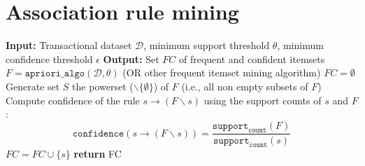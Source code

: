 \documentclass[12pt, openany]{report}
\theoremstyle{definition}
\begin{document}
\section{Association rule mining}
\begin{algorithm}[H]
    \caption{\texttt{Association\_rule\_mining\_algo}($\mathcal{D}$, $\theta$, $\epsilon$)}
    \begin{algorithmic}[1]
        \State \textbf{Input:} Transactional dataset $\mathcal{D}$, minimum support threshold $\theta$, minimum confidence threshold $\epsilon$
        \State \textbf{Output:} Set $FC$ of frequent and confident itemsets
        \State $F = \texttt{apriori\_algo}(\mathcal{D}, \theta)$ (OR other frequent itemset mining algorithm)
        \State $FC = \emptyset$
        \State Generate set $S$ the powerset ($\backslash \{\emptyset\} $) of $F$ (i.e., all non empty subsets of $F$)
            \State Compute confidence of the rule $s \rightarrow (F \backslash s)$ using the support counts of $s$ and $F$:
            \begin{equation}
                \texttt{confidence}(s \rightarrow (F \backslash s)) = \frac{\texttt{support}_\texttt{count}(F)}{\texttt{support}_\texttt{count}(s)}
            \end{equation}  
                \State $FC = FC \cup \{s\}$
            \EndIf
        \EndFor
        \State \textbf{return} FC
    \end{algorithmic}
\end{algorithm}
\end{document}
